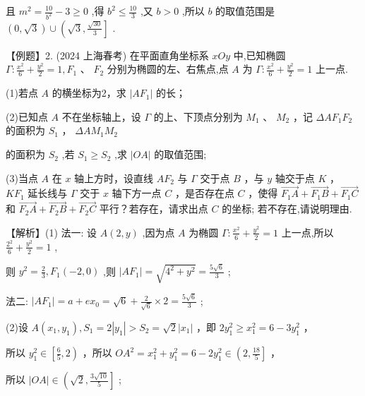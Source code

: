 \documentclass[10pt]{article}
\begin{document}
且 \({m}^{2} = \frac{10}{{b}^{2}} - 3 \geq  0\) ,得 \({b}^{2} \leq  \frac{10}{3}\) ,又 \(b > 0\) ,所以 \(b\) 的取值范围是 \(\left( {0,\sqrt{3}}\right)  \cup  \left( {\sqrt{3},\frac{\sqrt{30}}{3}}\right\rbrack\) .

【例题】2. (2024 上海春考) 在平面直角坐标系 \({xOy}\) 中,已知椭圆 \(\Gamma  : \frac{{x}^{2}}{6} + \frac{{y}^{2}}{2} = 1,{F}_{1}\text{ 、 }{F}_{2}\) 分别为椭圆的左、右焦点,点 \(A\) 为 \(\Gamma  : \frac{{x}^{2}}{6} + \frac{{y}^{2}}{2} = 1\) 上一点.

(1)若点 \(A\) 的横坐标为2，求 \(\left| {A{F}_{1}}\right|\) 的长；

(2)已知点 \(A\) 不在坐标轴上，设 \(\Gamma\) 的上、下顶点分别为 \({M}_{1}\) 、 \({M}_{2}\) ，记 \({\Delta A}{F}_{1}{F}_{2}\) 的面积为 \({S}_{1}\) ， \({\Delta A}{M}_{1}{M}_{2}\)

的面积为 \({S}_{2}\) ,若 \({S}_{1} \geq  {S}_{2}\) ,求 \(\left| {OA}\right|\) 的取值范围;

(3)当点 \(A\) 在 \(x\) 轴上方时，设直线 \(A{F}_{2}\) 与 \(\Gamma\) 交于点 \(B\) ，与 \(y\) 轴交于点 \(K\) ， \(K{F}_{1}\) 延长线与 \(\Gamma\) 交于 \(x\) 轴下方一点 \(C\) ，是否存在点 \(C\) ，使得 \(\overrightarrow{{F}_{1}A} + \overrightarrow{{F}_{1}B} + \overrightarrow{{F}_{1}C}\) 和 \(\overrightarrow{{F}_{2}A} + \overrightarrow{{F}_{2}B} + \overrightarrow{{F}_{2}C}\) 平行？若存在，请求出点 \(C\) 的坐标; 若不存在,请说明理由.

【解析】(1) 法一: 设 \(A\left( {2,y}\right)\) ,因为点 \(A\) 为椭圆 \(\Gamma  : \frac{{x}^{2}}{6} + \frac{{y}^{2}}{2} = 1\) 上一点,所以 \(\frac{{2}^{2}}{6} + \frac{{y}^{2}}{2} = 1\) ,

则 \({y}^{2} = \frac{2}{3},{F}_{1}\left( {-2,0}\right)\) ,则 \(\left| {A{F}_{1}}\right|  = \sqrt{{4}^{2} + {y}^{2}} = \frac{5\sqrt{6}}{3}\) ;

法二: \(\left| {A{F}_{1}}\right|  = a + e{x}_{0} = \sqrt{6} + \frac{2}{\sqrt{6}} \times  2 = \frac{5\sqrt{6}}{3}\) ;

(2)设 \(A\left( {{x}_{1},{y}_{1}}\right) ,{S}_{1} = 2\left| {y}_{1}\right|  > {S}_{2} = \sqrt{2}\left| {x}_{1}\right|\) ，即 \(2{y}_{1}^{2} \geq  {x}_{1}^{2} = 6 - 3{y}_{1}^{2}\) ，

所以 \({y}_{1}^{2} \in  \left\lbrack  {\frac{6}{5},2}\right)\) ，所以 \(O{A}^{2} = {x}_{1}^{2} + {y}_{1}^{2} = 6 - 2{y}_{1}^{2} \in  \left( {2,\frac{18}{5}}\right\rbrack\) ，

所以 \(\left| {OA}\right|  \in  \left( {\sqrt{2},\frac{3\sqrt{10}}{5}}\right\rbrack\) ;
\end{document}
